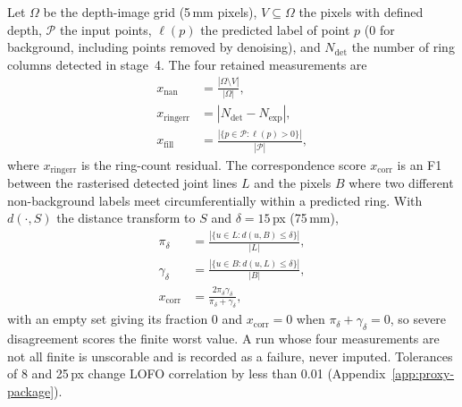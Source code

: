 \documentclass[a4paper,fleqn]{cas-dc}
\begin{document}
Let $\Omega$ be the depth-image grid (5\,mm pixels), $V\subseteq\Omega$ the pixels with defined depth, $\mathcal P$ the input points, $\ell(p)$ the predicted label of point $p$ (0 for background, including points removed by denoising), and $N_{\mathrm{det}}$ the number of ring columns detected in stage~4. The four retained measurements are
\begin{equation}
\begin{aligned}
x_{\mathrm{nan}}&=\frac{|\Omega\setminus V|}{|\Omega|},\\
x_{\mathrm{ringerr}}&=|N_{\mathrm{det}}-N_{\mathrm{exp}}|,\\
x_{\mathrm{fill}}&=\frac{|\{p\in\mathcal P:\ell(p)>0\}|}{|\mathcal P|},
\end{aligned}
\label{eq:feature-defs}
\end{equation}
where $x_{\mathrm{ringerr}}$ is the ring-count residual. The correspondence score $x_{\mathrm{corr}}$ is an F1 between the rasterised detected joint lines $L$ and the pixels $B$ where two different non-background labels meet circumferentially within a predicted ring. With $d(\cdot,S)$ the distance transform to $S$ and $\delta=15$\,px (75\,mm),
\begin{equation}
\begin{aligned}
\pi_\delta&=\frac{|\{u\in L: d(u,B)\le\delta\}|}{|L|},\\
\gamma_\delta&=\frac{|\{u\in B: d(u,L)\le\delta\}|}{|B|},\\
x_{\mathrm{corr}}&=\frac{2\pi_\delta\gamma_\delta}{\pi_\delta+\gamma_\delta},
\end{aligned}
\label{eq:corr-f1}
\end{equation}
with an empty set giving its fraction 0 and $x_{\mathrm{corr}}=0$ when $\pi_\delta+\gamma_\delta=0$, so severe disagreement scores the finite worst value. A run whose four measurements are not all finite is unscorable and is recorded as a failure, never imputed. Tolerances of 8 and 25\,px change LOFO correlation by less than 0.01 (Appendix~\ref{app:proxy-package}).
\end{document}
